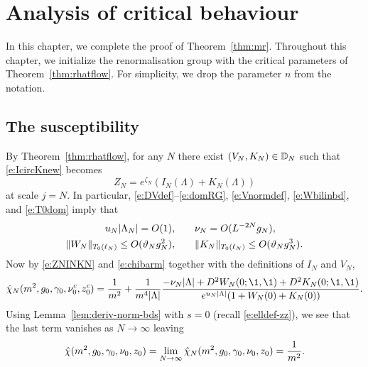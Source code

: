 \chapter{Analysis of critical behaviour}

In this chapter, we complete the proof of Theorem~\ref{thm:mr}.
Throughout this chapter, we initialize the renormalisation group
with the critical parameters of Theorem~\ref{thm:rhatflow}.
For simplicity, we drop the parameter $n$ from the notation.


\section{The susceptibility}

By Theorem~\ref{thm:rhatflow}, for any $N$ there exist
$(V_N, K_N) \in \mathbb{D}_N$ such that \eqref{e:IcircKnew} becomes
\begin{equation}
\label{e:ZNINKN}
Z_N = e^{\zeta_N} (I_N(\Lambda) + K_N(\Lambda))
\end{equation}
at scale $j = N$. In particular, \eqref{e:DVdef}--\eqref{e:domRG},
\eqref{e:Vnormdef}, \eqref{e:Wbilinbd}, and \eqref{e:T0dom} imply that
\begin{align}
\label{e:unu-bd}
u_N |\Lambda_N| = O(1),
	&\qquad
\nu_N = O(L^{-2 N} g_N),
	\\
\label{e:WKbd}
\|W_N\|_{T_0(\ell_N)} \le O(\vartheta_N g_N^2),
	&\qquad
\|K_N\|_{T_0(\ell_N)} \le O(\vartheta_N g_N^3).
\end{align}
Now by \eqref{e:ZNINKN} and \eqref{e:chibarm} together with the definitions of $I_N$ and $V_N$,
\begin{equation}
\hat\chi_N(m^2, \gcc_0, \gamma_0, \nu_0^c, z_0^c)
	=
\frac{1}{m^2}
	+
\frac{1}{m^4 |\Lambda|}
\frac{-\nu_N |\Lambda| + D^2 W_N(0; \1, \1) + D^2 K_N(0; \1, \1)}{e^{u_N |\Lambda|} (1 + W_N(0) + K_N(0))}.
\end{equation}
Using Lemma~\ref{lem:deriv-norm-bds} with $s = 0$ (recall \eqref{e:elldef-zz}),
we see that the last term vanishes as $N\to\infty$ leaving
\begin{equation}
\label{e:chi-m-hat}
\hat\chi(m^2, g_0, \gamma_0, \nu_0, z_0)
	=
\lim_{N\rightarrow\infty} \hat\chi_N(m^2, g_0, \gamma_0, \nu_0, z_0)
	=
\frac{1}{m^2}.
\end{equation}


